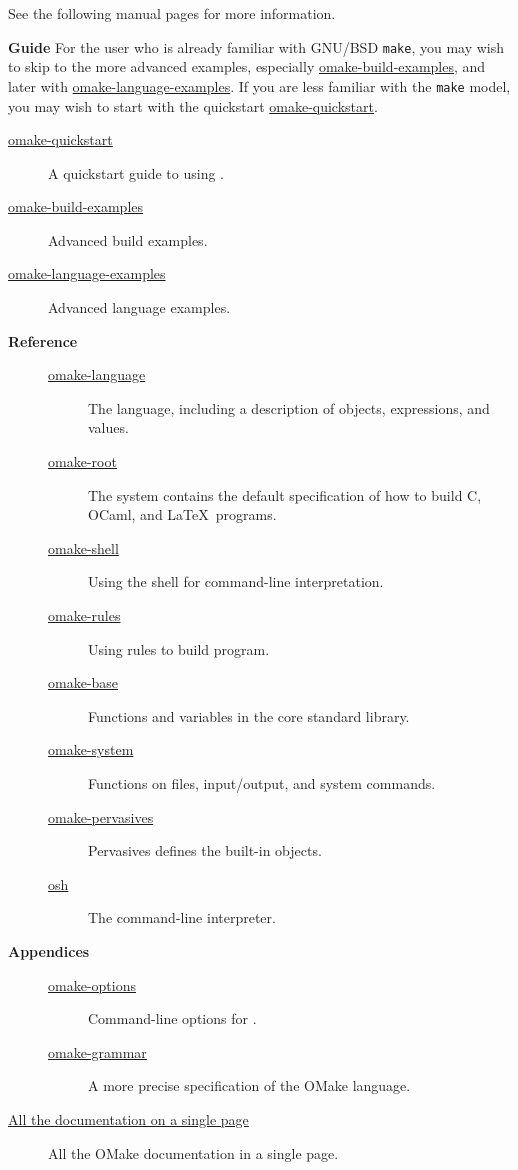 %
See the following manual pages for more information.

\textbf{Guide} For the user who is already familiar with GNU/BSD \verb+make+, you may wish to skip
to the more advanced examples, especially \href{omake-build-examples.html}{omake-build-examples},
and later with \href{omake-language-examples.html}{omake-language-examples}.  If you are less
familiar with the \verb+make+ model, you may wish to start with the quickstart
\href{omake-quickstart.html}{omake-quickstart}.

\begin{description}
\item[\href{omake-quickstart.html}{omake-quickstart}]
%
   A quickstart guide to using .
\item[\href{omake-build-examples.html}{omake-build-examples}]
%
   Advanced build examples.
\item[\href{omake-language-examples.html}{omake-language-examples}]
%
   Advanced language examples.
\item[\textbf{Reference}]
\begin{description}
\item[\href{omake-language.html}{omake-language}]
%
   The  language, including a description of objects, expressions, and values.
\item[\href{omake-root.html}{omake-root}]
%
   The system  contains the default specification of how to build C, OCaml, and
   \LaTeX\ programs.
\item[\href{omake-shell.html}{omake-shell}]
%
   Using the  shell for command-line interpretation.
\item[\href{omake-rules.html}{omake-rules}]
%
   Using  rules to build program.
\item[\href{omake-base.html}{omake-base}]
%
   Functions and variables in the core standard library.
\item[\href{omake-system.html}{omake-system}]
%
   Functions on files, input/output, and system commands.
\item[\href{omake-pervasives.html}{omake-pervasives}]
%
   Pervasives defines the built-in objects.
\item[\href{osh.html}{osh}]
%
   The  command-line interpreter.
\end{description}
\item[\textbf{Appendices}]
\begin{description}
\item[\href{omake-options.html}{omake-options}]
%
   Command-line options for .
%
\item[\href{omake-grammar.html}{omake-grammar}]
%
   A more precise specification of the OMake language.
\end{description}
\item[\href{omake-doc.html}{All the documentation on a single page}]
%
   All the OMake documentation in a single page.
\end{description}

